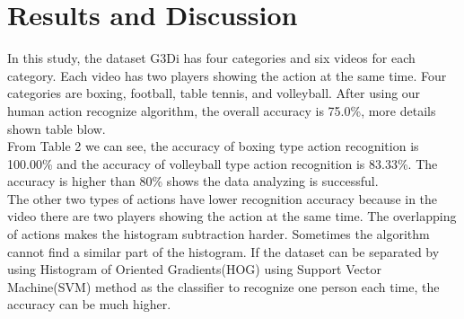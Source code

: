 \documentclass[runningheads,a4paper]{llncs}
\begin{document}
\section{Results and Discussion}

	In this study, the dataset G3Di has four categories and six videos for each category. Each video has two players showing the action at the same time. Four categories are boxing, football, table tennis, and volleyball. After using our human action recognize algorithm, the overall accuracy is  75.0\%, more details shown table blow.\\

	From Table 2 we can see, the accuracy of boxing type action recognition is 100.00\% and the accuracy of volleyball type action recognition is 83.33\%. The accuracy is higher than 80\% shows the data analyzing is successful. \\
	The other two types of actions have lower recognition accuracy because in the video there are two players showing the action at the same time. The overlapping of actions makes the histogram subtraction harder. Sometimes the algorithm cannot find a similar part of the histogram. If the dataset can be separated by using Histogram of Oriented Gradients(HOG) \cite{6} using Support Vector Machine(SVM) method\cite{7} as the classifier to recognize one person each time, the accuracy can be much higher.\\
\end{document}
